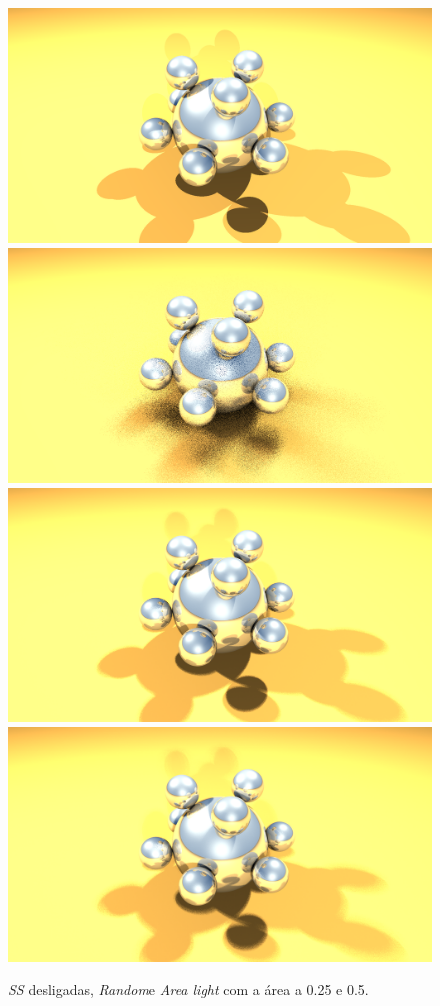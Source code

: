 \documentclass{article}
\begin{document}
            \begin{figure}[h]
                \centering
                \includegraphics[scale=0.06]{ssoff}
                \includegraphics[scale=0.06]{ssrd}
                \includegraphics[scale=0.06]{ssal1}
                \includegraphics[scale=0.06]{ssal2}
                \caption{\textit{SS} desligadas, \textit{Random}e \textit{Area light} com a área a 0.25 e 0.5.}
            \end{figure}    
\end{document}
